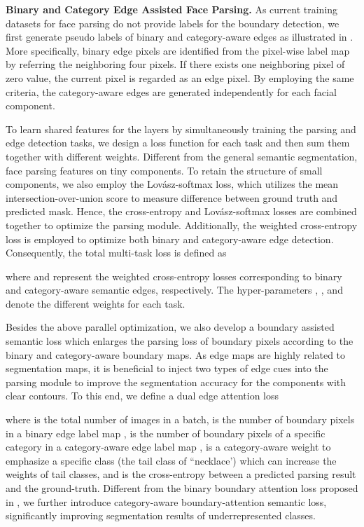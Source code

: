 \documentclass[10pt,twocolumn,letterpaper]{article}
\begin{document}
\noindent\textbf{Binary and Category Edge Assisted Face Parsing.} 
As current training datasets for face parsing do not provide labels for the boundary detection, we first generate pseudo labels of binary and category-aware edges as illustrated in \figureautorefname{ \ref{fig:edgegeneration}}. More specifically, binary edge pixels are identified from the pixel-wise label map by referring the neighboring four pixels. If there exists one neighboring pixel of zero value, the current pixel is regarded as an edge pixel. By employing the same criteria, the category-aware edges are generated independently for each facial component.

To learn shared features for the layers  by simultaneously training the parsing and edge detection tasks, we design a loss function for each task and then sum them together with different weights. Different from the general semantic segmentation, face parsing features on tiny components. To retain the structure of small components, we also employ the Lov{\'a}sz-softmax \cite{lovasz} loss, which utilizes the mean intersection-over-union score to measure difference between ground truth and predicted mask. Hence, the cross-entropy \cite{bce} and Lov{\'a}sz-softmax \cite{lovasz} losses are combined together to optimize the parsing module. Additionally, the weighted cross-entropy \cite{bce} loss is employed to optimize both binary and category-aware edge detection. Consequently, the total multi-task loss is defined as
\small
 
where  and  represent the weighted cross-entropy losses \cite{bce} corresponding to binary and category-aware semantic edges, respectively. The hyper-parameters , , and  denote the different weights for each task.

Besides the above parallel optimization, we also develop a boundary assisted semantic loss which enlarges the parsing loss of boundary pixels according to the binary and category-aware boundary maps. As edge maps are highly related to segmentation maps, it is beneficial to inject two types of edge cues into the parsing module to improve the segmentation accuracy for the components with clear contours. 
To this end, we define a dual edge attention loss
\small


\normalsize
where  is the total number of images in a batch,  is the number of boundary pixels in a binary edge label map ,  is the number of boundary pixels of a specific category  in a category-aware edge label map ,  is a category-aware weight to emphasize a  specific class  (\eg the tail class of ``necklace') which can increase the weights of tail classes, and  is the cross-entropy between a predicted parsing result and the ground-truth. Different from the binary boundary attention loss proposed in \cite{lapa}, we further introduce category-aware boundary-attention semantic loss, significantly improving segmentation results of underrepresented classes.
\end{document}
